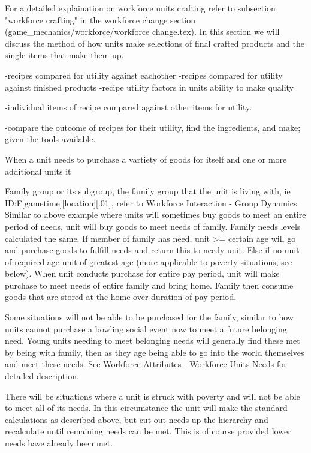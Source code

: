 For a detailed explaination on workforce units crafting refer to subsection "workforce crafting" in the workforce change section (game_mechanics/workforce/workforce change.tex). In this section we will discuss the method of how units make selections of final crafted products and the single items that make them up. 

-recipes compared for utility against eachother
-recipes compared for utility against finished products
-recipe utility factors in units ability to make quality

-individual items of recipe compared against other items for utility.

-compare the outcome of recipes for their utility, find the ingredients, and make; given the tools available.



When a unit needs to purchase a vartiety of goods for itself and one or more additional units it

Family group or its subgroup, the family group that the unit is living with, ie ID:F[gametime][location][.01], refer to Workforce Interaction - Group Dynamics. Similar to above example where units will sometimes buy goods to meet an entire period of needs, unit will buy goods to meet needs of family.
Family needs levels calculated the same. If member of family has need, unit >= certain age will go and purchase goods to fulfill needs and return this to needy unit. Else if no unit of required age unit of greatest age (more applicable to poverty situations, see below). When unit conducts purchase for entire pay period, unit will make purchase to meet needs of entire family and bring home. Family then consume goods that are stored at the home over duration of pay period.

Some situations will not be able to be purchased for the family, similar to how units cannot purchase a bowling social event now to meet a future belonging need. Young units needing to meet belonging needs will generally find these met by being with family, then as they age being able to go into the world themselves and meet these needs. See Workforce Attributes - Workforce Units Needs for detailed description.


There will be situations where a unit is struck with poverty and will not be able to meet all of its needs. In this circumstance the unit will make the standard calculations as described above, but cut out needs up the hierarchy and recalculate until remaining needs can be met. This is of course provided lower needs have already been met.



